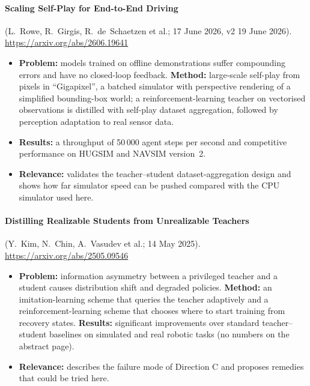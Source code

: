 \paragraph{Scaling Self-Play for End-to-End Driving} (L.~Rowe, R.~Girgis, R.~de~Schaetzen et al.; 17 June 2026, v2 19 June 2026). \url{https://arxiv.org/abs/2606.19641}
\begin{itemize}
\item \textbf{Problem:} models trained on offline demonstrations suffer compounding errors and have no closed-loop feedback. \textbf{Method:} large-scale self-play from pixels in ``Gigapixel'', a batched simulator with perspective rendering of a simplified bounding-box world; a reinforcement-learning teacher on vectorised observations is distilled with self-play dataset aggregation, followed by perception adaptation to real sensor data.
\item \textbf{Results:} a throughput of 50\,000 agent steps per second and competitive performance on HUGSIM and NAVSIM version~2.
\item \textbf{Relevance:} validates the teacher--student dataset-aggregation design and shows how far simulator speed can be pushed compared with the CPU simulator used here.
\end{itemize}

\paragraph{Distilling Realizable Students from Unrealizable Teachers} (Y.~Kim, N.~Chin, A.~Vasudev et al.; 14 May 2025). \url{https://arxiv.org/abs/2505.09546}
\begin{itemize}
\item \textbf{Problem:} information asymmetry between a privileged teacher and a student causes distribution shift and degraded policies. \textbf{Method:} an imitation-learning scheme that queries the teacher adaptively and a reinforcement-learning scheme that chooses where to start training from recovery states. \textbf{Results:} significant improvements over standard teacher--student baselines on simulated and real robotic tasks (no numbers on the abstract page).
\item \textbf{Relevance:} describes the failure mode of Direction C and proposes remedies that could be tried here.
\end{itemize}

